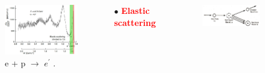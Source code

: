\documentclass[12pt]{beamer}
\begin{document}
\begin{frame}
\begin{columns}[c] %
	\begin{figure}[]
		\centering
		\includegraphics[width=5cm]{../images/Thesis/elasticspectrum_2.png}
		\caption*{e + p $\rightarrow$ $e^{\prime}$ \cite{deltaIsobar}.}
		\label{wspect}
	\end{figure}
	
	$\bullet$ \textbf{\textcolor{red}{Elastic scattering}}\\
	
	\begin{figure}[]
		\includegraphics[width=4cm]{../images/ele_draw.png}
	\end{figure}

	
	
\end{columns}
\end{frame}


\end{document}
